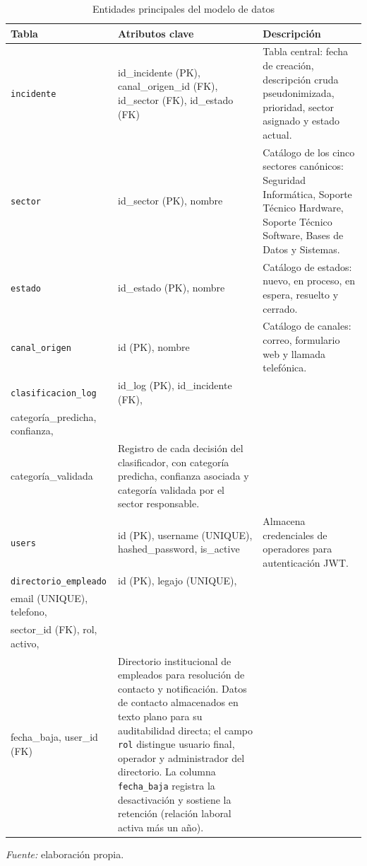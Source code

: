 \begin{table}[htbp]
\centering
\caption{Entidades principales del modelo de datos}
\label{tab:entidades}
\small
\begin{tabular}{@{}p{2.5cm} >{\raggedright\arraybackslash}p{4.8cm} >{\raggedright\arraybackslash}p{5.5cm}@{}}
\toprule
\textbf{Tabla} & \textbf{Atributos clave} & \textbf{Descripción} \\
\midrule
\texttt{incidente} & id\_incidente (PK), canal\_origen\_id (FK), id\_sector (FK), id\_estado (FK) & Tabla central: fecha de creación, descripción cruda pseudonimizada, prioridad, sector asignado y estado actual. \\
\texttt{sector} & id\_sector (PK), nombre & Catálogo de los cinco sectores canónicos: Seguridad Informática, Soporte Técnico Hardware, Soporte Técnico Software, Bases de Datos y Sistemas. \\
\texttt{estado} & id\_estado (PK), nombre & Catálogo de estados: nuevo, en proceso, en espera, resuelto y cerrado. \\
\texttt{canal\_origen} & id (PK), nombre & Catálogo de canales: correo, formulario web y llamada telefónica. \\
\texttt{clasificacion\_log} & id\_log (PK), id\_incidente (FK), \\ categoría\_predicha, confianza, \\ categoría\_validada & Registro de cada decisión del clasificador, con categoría predicha, confianza asociada y categoría validada por el sector responsable. \\
\texttt{users} & id (PK), username (UNIQUE), hashed\_password, is\_active & Almacena credenciales de operadores para autenticación JWT. \\
\texttt{directorio\_empleado} & id (PK), legajo (UNIQUE), \\ email (UNIQUE), telefono, \\ sector\_id (FK), rol, activo, \\ fecha\_baja, user\_id (FK) & Directorio institucional de empleados para resolución de contacto y notificación. Datos de contacto almacenados en texto plano para su auditabilidad directa; el campo \texttt{rol} distingue usuario final, operador y administrador del directorio. La columna \texttt{fecha\_baja} registra la desactivación y sostiene la retención (relación laboral activa más un año). \\
\bottomrule
\end{tabular}
\par\smallskip
{\footnotesize\textit{Fuente:} elaboración propia.\par}
\end{table}

